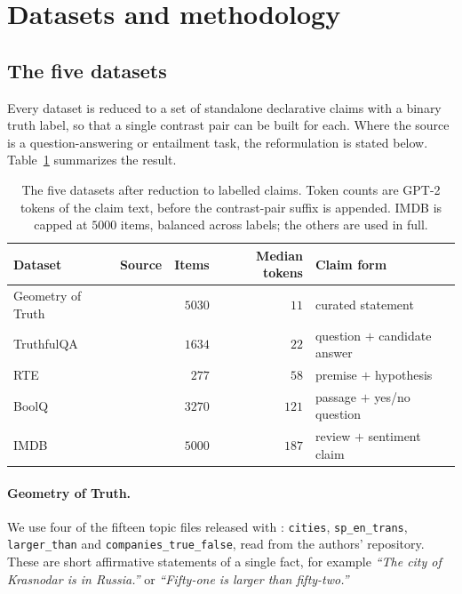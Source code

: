 \section{Datasets and methodology}
\label{app:datasets}

\subsection{The five datasets}

Every dataset is reduced to a set of standalone declarative claims with a binary
truth label, so that a single contrast pair can be built for each. Where the
source is a question-answering or entailment task, the reformulation is stated
below. Table~\ref{tab:datasets} summarizes the result.

\begin{table}[h]
\centering
\small
\begin{tabular}{llrrl}
\toprule
Dataset & Source & Items & Median tokens & Claim form \\
\midrule
Geometry of Truth & \citet{marks2024geometry} & $5030$ & $11$ & curated statement \\
TruthfulQA        & \citet{lin2022truthfulqa} & $1634$ & $22$ & question $+$ candidate answer \\
RTE               & \citet{wang2018glue}      & $277$  & $58$ & premise $+$ hypothesis \\
BoolQ             & \citet{clark2019boolq}    & $3270$ & $121$ & passage $+$ yes/no question \\
IMDB              & \citet{maas2011imdb}      & $5000$ & $187$ & review $+$ sentiment claim \\
\bottomrule
\end{tabular}
\caption{The five datasets after reduction to labelled claims. Token counts are
GPT-2 tokens of the claim text, before the contrast-pair suffix is appended.
IMDB is capped at $5000$ items, balanced across labels; the others are used in
full.}
\label{tab:datasets}
\end{table}

\paragraph{Geometry of Truth.}
We use four of the fifteen topic files released with
\citet{marks2024geometry}: \texttt{cities}, \texttt{sp\_en\_trans},
\texttt{larger\_than} and \texttt{companies\_true\_false}, read from the
authors' repository. These are short affirmative statements of a single fact,
for example \emph{``The city of Krasnodar is in Russia.''} or \emph{``Fifty-one
is larger than fifty-two.''}

